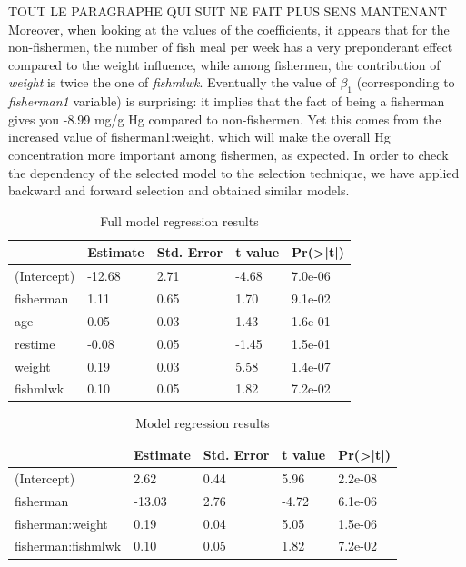 \documentclass[12pt,]{article}
\begin{document}
TOUT LE PARAGRAPHE QUI SUIT NE FAIT PLUS SENS MANTENANT Moreover, when
looking at the values of the coefficients, it appears that for the
non-fishermen, the number of fish meal per week has a very preponderant
effect compared to the weight influence, while among fishermen, the
contribution of \emph{weight} is twice the one of \emph{fishmlwk}.
Eventually the value of \(\beta_1\) (corresponding to \emph{fisherman1}
variable) is surprising: it implies that the fact of being a fisherman
gives you -8.99 mg/g Hg compared to non-fishermen. Yet this comes from
the increased value of fisherman1:weight, which will make the overall Hg
concentration more important among fishermen, as expected. In order to
check the dependency of the selected model to the selection technique,
we have applied backward and forward selection and obtained similar
models.

\begin{table}[t]

\caption{\label{tab:unnamed-chunk-12}Full model regression results}
\centering
\begin{tabular}{l|l|l|l|l}
\hline
  & Estimate & Std. Error & t value & Pr(>|t|)\\
\hline
\rowcolor{gray!6}  (Intercept) & -12.68 & 2.71 & -4.68 & 7.0e-06\\
\hline
fisherman & 1.11 & 0.65 & 1.70 & 9.1e-02\\
\hline
\rowcolor{gray!6}  age & 0.05 & 0.03 & 1.43 & 1.6e-01\\
\hline
restime & -0.08 & 0.05 & -1.45 & 1.5e-01\\
\hline
\rowcolor{gray!6}  weight & 0.19 & 0.03 & 5.58 & 1.4e-07\\
\hline
fishmlwk & 0.10 & 0.05 & 1.82 & 7.2e-02\\
\hline
\end{tabular}
\end{table}

\begin{table}[t]

\caption{\label{tab:unnamed-chunk-14}Model regression results}
\centering
\begin{tabular}{l|l|l|l|l}
\hline
  & Estimate & Std. Error & t value & Pr(>|t|)\\
\hline
\rowcolor{gray!6}  (Intercept) & 2.62 & 0.44 & 5.96 & 2.2e-08\\
\hline
fisherman & -13.03 & 2.76 & -4.72 & 6.1e-06\\
\hline
\rowcolor{gray!6}  fisherman:weight & 0.19 & 0.04 & 5.05 & 1.5e-06\\
\hline
fisherman:fishmlwk & 0.10 & 0.05 & 1.82 & 7.2e-02\\
\hline
\end{tabular}
\end{table}
\end{document}
